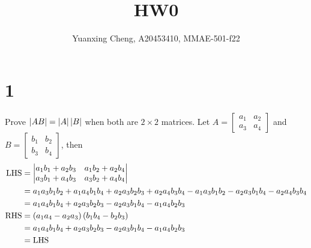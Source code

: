 \documentclass{article}
\title{HW0}
\author{Yuanxing Cheng, A20453410, MMAE-501-f22}
\begin{document}
\maketitle

\section*{1}

\begin{myleftlinebox}
    Prove \(\left\vert AB\right\vert = \left\vert A\right\vert\left\vert B\right\vert\) when both are \(2\times 2\) matrices.
    \tcblower
    Let \(A = \begin{bmatrix}
        a_1 & a_2\\
        a_3 & a_4
    \end{bmatrix}\) and  \(B = \begin{bmatrix}
        b_1 & b_2\\
        b_3 & b_4
    \end{bmatrix}\), then
    \begin{align*}
        \text{LHS} & = \begin{vmatrix}
            a_1 b_1+a_2 b_3 & a_1b_2+a_2 b_4 \\ 
            a_3b_1 +a_4 b_3 & a_3b_2+a_4 b_4
            \end{vmatrix}\\
            &= a_1a_3b_1b_2+a_1a_4b_1b_4+a_2a_3b_2b_3+a_2a_4b_3b_4-a_1a_3b_1b_2-a_2a_3b_1b_4-a_2a_4b_3b_4\\
            &= a_1a_4b_1b_4+a_2a_3b_2b_3-a_2a_3b_1b_4-a_1a_4b_2b_3\\
            \text{RHS} &= \left( a_1a_4-a_2a_3 \right)\left( b_1b_4-b_2b_3 \right)\\
            &= a_1a_4b_1b_4+a_2a_3b_2b_3-a_2a_3b_1b_4-a_1a_4b_2b_3\\
            & = \text{LHS}
    \end{align*}
\end{myleftlinebox}
\end{document}
